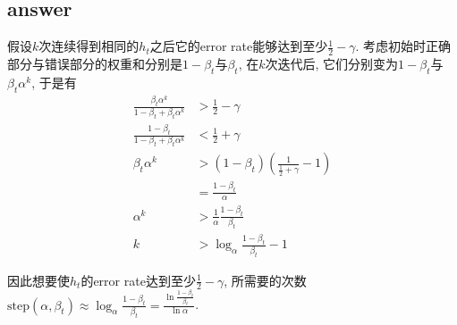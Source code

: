 \documentclass[12pt]{article}
\begin{document}
	\subsection*{answer}
	假设$k$次连续得到相同的$h_t$之后它的error rate能够达到至少$\frac12 - \gamma$.
	考虑初始时正确部分与错误部分的权重和分别是$1 - \beta_t$与$\beta_t$, 在$k$次迭代后, 它们分别变为$1 - \beta_t$与$\beta_t\alpha^k$, 于是有\begin{align*}
\frac{\beta_t\alpha^k}{1 - \beta_t + \beta_t\alpha^k} &> \frac12 - \gamma\\
\frac{1 - \beta_t}{1 - \beta_t + \beta_t\alpha^k} &< \frac12 + \gamma\\
\beta_t\alpha^k &> (1 - \beta_t)(\frac{1}{\frac12 + \gamma} - 1)\\ &= \frac{1 - \beta_t}{\alpha}\\
\alpha^k &> \frac{1}{\alpha}\frac{1 - \beta_t}{\beta_t}\\
k &> \log_{\alpha}\frac{1 - \beta_t}{\beta_t} - 1
\end{align*}
	
	因此想要使$h_t$的error rate达到至少$\frac12 - \gamma$, 所需要的次数$\text{step}(\alpha, \beta_t) \approx \log_{\alpha}\frac{1 - \beta_t}{\beta_t} = \frac{\ln\frac{1 - \beta_t}{\beta_t}}{\ln\alpha}$.
\end{document}
